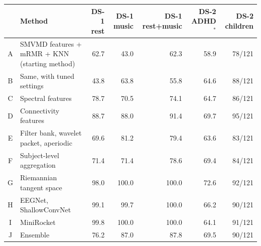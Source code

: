 \small
\begin{tabular}{clrrrrr}
\hline
 & Method & DS-1 rest & DS-1 music & DS-1 rest+music & DS-2 ADHD$^\ast$ & DS-2 children \\
\hline
A & SMVMD features + mRMR + KNN (starting method) & 62.7 & 43.0 & 62.3 & 58.9 & 78/121 \\
B & Same, with tuned settings & 43.8 & 63.8 & 55.8 & 64.6 & 88/121 \\
C & Spectral features & 78.7 & 70.5 & 74.1 & 64.7 & 86/121 \\
D & Connectivity features & 88.7 & 88.0 & 91.4 & 69.7 & 95/121 \\
E & Filter bank, wavelet packet, aperiodic & 69.6 & 81.2 & 79.4 & 63.6 & 83/121 \\
F & Subject-level aggregation & 71.4 & 71.4 & 78.6 & 69.4 & 84/121 \\
G & Riemannian tangent space & 98.0 & 100.0 & 100.0 & 72.6 & 92/121 \\
H & EEGNet, ShallowConvNet & 99.1 & 99.7 & 100.0 & 66.2 & 90/121 \\
I & MiniRocket & 99.8 & 100.0 & 100.0 & 64.1 & 91/121 \\
J & Ensemble & 76.2 & 87.0 & 87.8 & 69.5 & 90/121 \\
\hline
\end{tabular}
